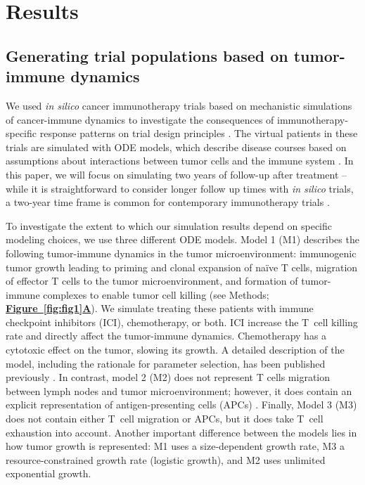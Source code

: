 \documentclass[a4paper,10pt]{article}
\newcommand{\myref}[2]{\hyperref[#1]{\bfseries Figure~\ref*{#1}#2}}
\newcommand{\newbit}{\color{red!70!black}}
\begin{document}
\clearpage

\section*{Results}
\label{results}

\subsection*{Generating trial populations based on tumor-immune dynamics}

We used \emph{in silico} cancer immunotherapy trials based on mechanistic simulations
of cancer-immune dynamics to investigate the consequences of
immunotherapy-specific response patterns on trial design principles \cite{Xu2016}.
The virtual patients in these trials are simulated with ODE models, which describe
disease courses based on assumptions about interactions between tumor cells
and the immune system \cite{Xu2016}. 
{\newbit{}
In this paper, we will focus on simulating 
two years of follow-up after treatment -- while it is straightforward to consider longer follow up
times with \emph{in silico} trials, a two-year time frame is common 
for contemporary immunotherapy trials \cite{Chen2019,Hellmann2019,Baas2021}.
}

{\newbit{}
To investigate the extent to which our simulation results depend on specific modeling choices, we use 
three different ODE models. Model 1 (M1) describes the following
tumor-immune dynamics in the tumor microenvironment: immunogenic tumor growth
leading to priming and clonal expansion of na\"ive T cells,
migration of effector T cells to the tumor microenvironment,
and formation of tumor-immune complexes to enable tumor cell killing (see
Methods; \myref{fig:fig1}{A}). We simulate treating these patients with 
immune checkpoint inhibitors (ICI), chemotherapy, or both. ICI increase the T~cell 
killing rate and directly affect the tumor-immune dynamics. Chemotherapy has a cytotoxic effect on the tumor,
slowing its growth. A detailed description of the model, including
the rationale for parameter selection, has been published previously \cite{Xu2016}.
In contrast, model 2 (M2) does not represent T cells migration
between lymph nodes and tumor microenvironment; however, it does contain an explicit 
representation of antigen-presenting cells (APCs) \cite{Tsur2019}. Finally, Model 3 (M3) 
does not contain either T~cell migration or APCs, but it does take T~cell 
exhaustion into account.
Another important difference between the models lies in how tumor growth is represented: 
M1 uses a size-dependent growth rate,
M3 a resource-constrained growth rate (logistic growth), and M2 uses unlimited
exponential growth.}
\end{document}
